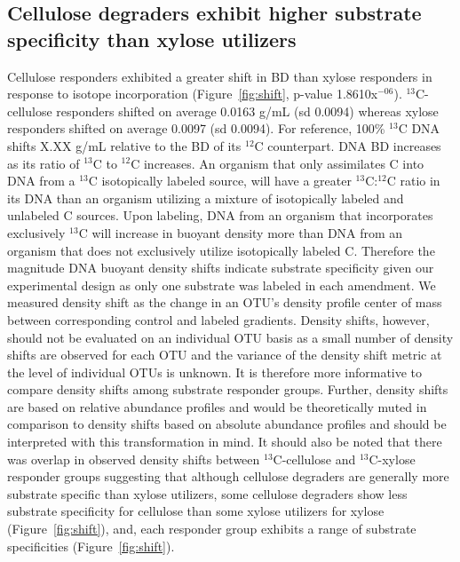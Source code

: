 \subsection{Cellulose degraders exhibit higher substrate specificity than xylose
utilizers} 
Cellulose responders exhibited a greater shift in BD than xylose
responders in response to isotope incorporation (Figure~\ref{fig:shift},
p-value 1.8610x$^{-06}$). $^{13}$C-cellulose responders shifted on average 0.0163
g/mL (sd 0.0094) whereas xylose responders shifted on average 0.0097 (sd
0.0094). For reference, 100\% $^{13}$C DNA shifts X.XX g/mL relative to the BD
of its $^{12}$C counterpart. DNA BD increases as its ratio of $^{13}$C to
$^{12}$C increases. An organism that only assimilates C into DNA from a
$^{13}$C isotopically labeled source, will have a greater $^{13}$C:$^{12}$C
ratio in its DNA than an organism utilizing a mixture of isotopically labeled
and unlabeled C sources. Upon labeling, DNA from an organism that incorporates
exclusively $^{13}$C will increase in buoyant density more than DNA from an
organism that does not exclusively utilize isotopically labeled C. Therefore
the magnitude DNA buoyant density shifts indicate substrate specificity given
our experimental design as only one substrate was labeled in each amendment. We
measured density shift as the change in an OTU's density profile center of mass
between corresponding control and labeled gradients. Density shifts, however,
should not be evaluated on an individual OTU basis as a small number of density
shifts are observed for each OTU and the variance of the density shift metric
at the level of individual OTUs is unknown. It is therefore more informative to
compare density shifts among substrate responder groups. Further, density
shifts are based on relative abundance profiles and would be theoretically
muted in comparison to density shifts based on absolute abundance profiles and
should be interpreted with this transformation in mind. It should also be noted
that there was overlap in observed density shifts between $^{13}$C-cellulose
and $^{13}$C-xylose responder groups suggesting that although cellulose
degraders are generally more substrate specific than xylose utilizers, some
cellulose degraders show less substrate specificity for cellulose than some
xylose utilizers for xylose (Figure~\ref{fig:shift}), and, each responder group
exhibits a range of substrate specificities (Figure~\ref{fig:shift}).
